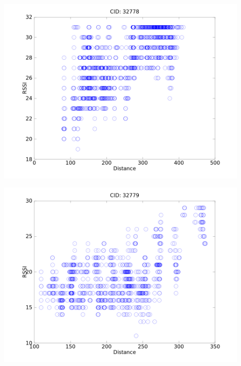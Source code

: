 \documentclass{beamer}
\begin{document}
{\begin{columns}[T]
\begin{column}{0.32\textwidth}
			\includegraphics[width=0.95\textwidth]{cell32778raw-contrast.png}
	
			\includegraphics[width=0.95\textwidth]{cell32779raw-contrast.png}
		\end{column}
	\end{columns}
}
\end{document}
